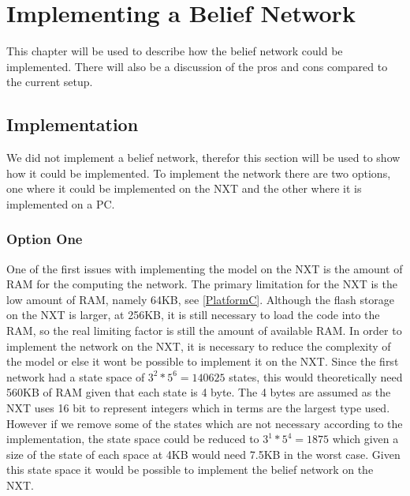 \chapter{Implementing a Belief Network}
This chapter will be used to describe how the belief network could be
implemented. There will also be a discussion of the pros and cons compared to
the current setup.

\section{Implementation}

We did not implement a belief network, therefor this section will be used to
show how it could be implemented. To implement the network there are two
options, one where it could be implemented on the NXT and the other where it is
implemented on a PC. 

% 

\subsection{Option One}
One of the first issues with implementing the model on the NXT is the amount of
RAM for the computing the network. The primary limitation for the NXT is the
low amount of RAM, namely 64KB, see \autoref{PlatformC}. Although the flash
storage on the NXT is larger, at 256KB, it is still necessary to load the code
into the RAM, so the real limiting factor is still the amount of available RAM. 
In order to implement the network on the NXT, it is necessary to reduce the
complexity of the model or else it wont be possible to implement it on the NXT.
Since the first network had a state space of $3^2*5^6 = 140625$ states, this
would theoretically need 560KB of RAM given that each state is 4 byte. The 4
bytes are assumed as the NXT uses 16 bit to represent integers which in terms
are the largest type used. However if we remove some of the states which are not
necessary according to the implementation, the state space could be reduced to
$3^1*5^4 = 1875$ which given a size of the state of each space at 4KB would need
7.5KB in the worst case. Given this state space it would be possible to
implement the belief network on the NXT.

